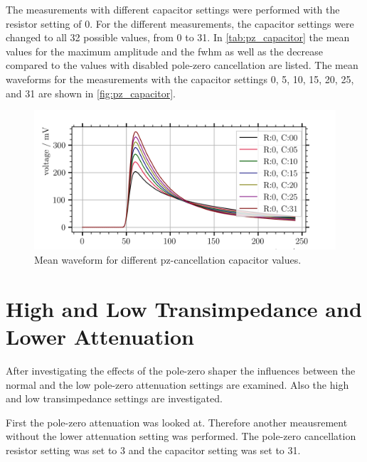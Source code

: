 The measurements with different capacitor settings were performed with the resistor setting of 0.
For the different measurements, the capacitor settings were changed to all 32 possible values, from 0 to 31.
In \autoref{tab:pz_capacitor} the mean values for the maximum amplitude and the \ac{fwhm} as well as the decrease compared to the values with disabled pole-zero cancellation are listed.
The mean waveforms for the measurements with the capacitor settings 0, 5, 10, 15, 20, 25, and 31 are shown in \autoref{fig:pz_capacitor}.
\begin{figure}
	\centering
	\includegraphics[width=1.\textwidth]{pictures/pz_capacitor.png}
	\caption[Mean waveform for different pz-cancellation capacitor values.]{Mean waveform for different pz-cancellation capacitor values.}
	\label{fig:pz_capacitor}
\end{figure}





\section{High and Low Transimpedance and Lower Attenuation}
After investigating the effects of the pole-zero shaper the influences between the normal and the low pole-zero attenuation settings are examined.
Also the high and low transimpedance settings are investigated.

First the pole-zero attenuation was looked at.
Therefore another meausrement without the lower attenuation setting was performed.
The pole-zero cancellation resistor setting was set to 3 and the capacitor setting was set to 31. 


